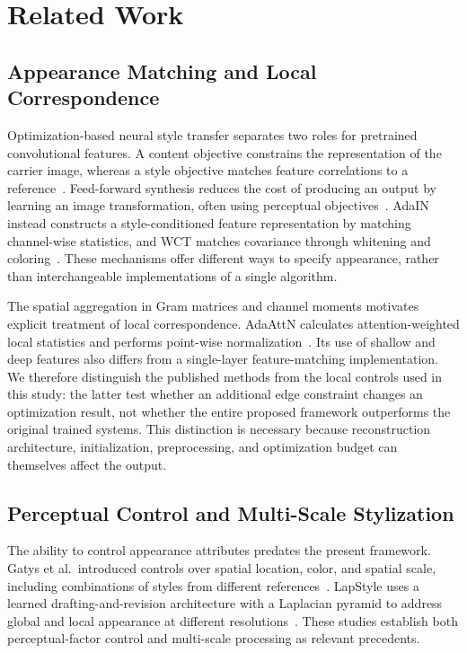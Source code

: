 \section{Related Work}
\label{sec:related}

\subsection{Appearance Matching and Local Correspondence}
Optimization-based neural style transfer separates two roles for pretrained convolutional features. A content objective constrains the representation of the carrier image, whereas a style objective matches feature correlations to a reference~\cite{gatys2016}. Feed-forward synthesis reduces the cost of producing an output by learning an image transformation, often using perceptual objectives~\cite{johnson2016}. AdaIN instead constructs a style-conditioned feature representation by matching channel-wise statistics, and WCT matches covariance through whitening and coloring~\cite{huang2017,li2017}. These mechanisms offer different ways to specify appearance, rather than interchangeable implementations of a single algorithm.

The spatial aggregation in Gram matrices and channel moments motivates explicit treatment of local correspondence. AdaAttN calculates attention-weighted local statistics and performs point-wise normalization~\cite{liu2021}. Its use of shallow and deep features also differs from a single-layer feature-matching implementation. We therefore distinguish the published methods from the local controls used in this study: the latter test whether an additional edge constraint changes an optimization result, not whether the entire proposed framework outperforms the original trained systems. This distinction is necessary because reconstruction architecture, initialization, preprocessing, and optimization budget can themselves affect the output.

\subsection{Perceptual Control and Multi-Scale Stylization}
The ability to control appearance attributes predates the present framework. Gatys et al.\ introduced controls over spatial location, color, and spatial scale, including combinations of styles from different references~\cite{gatys2017control}. LapStyle uses a learned drafting-and-revision architecture with a Laplacian pyramid to address global and local appearance at different resolutions~\cite{lapstyle2021}. These studies establish both perceptual-factor control and multi-scale processing as relevant precedents.

